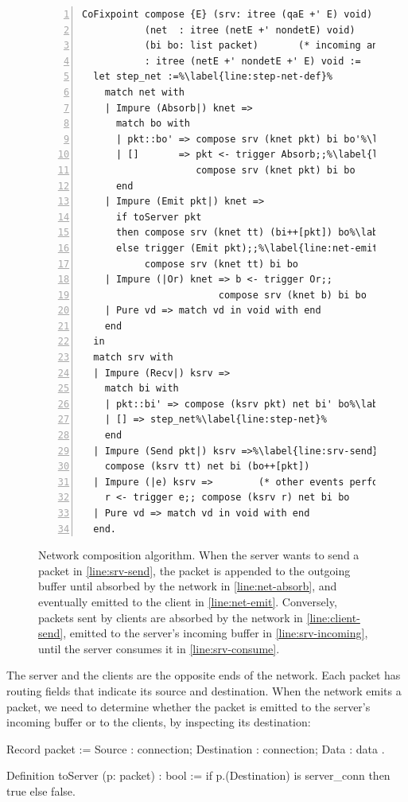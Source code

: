 \begin{figure}
\begin{lstlisting}[numbers=left]
CoFixpoint compose {E} (srv: itree (qaE +' E) void)   (* server  model *)
           (net  : itree (netE +' nondetE) void)      (* network model *)
           (bi bo: list packet)       (* incoming and outgoing buffers *)
           : itree (netE +' nondetE +' E) void :=
  let step_net :=%\label{line:step-net-def}%
    match net with
    | Impure (Absorb|) knet =>
      match bo with
      | pkt::bo' => compose srv (knet pkt) bi bo'%\label{line:net-absorb}%
      | []       => pkt <- trigger Absorb;;%\label{line:client-send}%
                    compose srv (knet pkt) bi bo
      end
    | Impure (Emit pkt|) knet =>
      if toServer pkt
      then compose srv (knet tt) (bi++[pkt]) bo%\label{line:srv-incoming}%
      else trigger (Emit pkt);;%\label{line:net-emit}%
           compose srv (knet tt) bi bo
    | Impure (|Or) knet => b <- trigger Or;;
                        compose srv (knet b) bi bo
    | Pure vd => match vd in void with end
    end
  in
  match srv with
  | Impure (Recv|) ksrv =>
    match bi with
    | pkt::bi' => compose (ksrv pkt) net bi' bo%\label{line:srv-consume}%
    | [] => step_net%\label{line:step-net}%
    end
  | Impure (Send pkt|) ksrv =>%\label{line:srv-send}%
    compose (ksrv tt) net bi (bo++[pkt])
  | Impure (|e) ksrv =>        (* other events performed by the server *)
    r <- trigger e;; compose (ksrv r) net bi bo
  | Pure vd => match vd in void with end
  end.
\end{lstlisting}
\caption[Network composition algorithm]{Network composition algorithm.  When the
  server wants to send a packet in \autoref{line:srv-send}, the packet is
  appended to the outgoing buffer until absorbed by the network in
  \autoref{line:net-absorb}, and eventually emitted to the client in
  \autoref{line:net-emit}.  Conversely, packets sent by clients are absorbed by
  the network in \autoref{line:client-send}, emitted to the server's incoming
  buffer in \autoref{line:srv-incoming}, until the server consumes it in
  \autoref{line:srv-consume}.}
\label{fig:net-compose-code}
\end{figure}

The server and the clients are the opposite ends of the network.  Each packet
has routing fields that indicate its source and destination.  When the network
emits a packet, we need to determine whether the packet is emitted to the
server's incoming buffer or to the clients, by inspecting its destination:
\begin{coq}
  Record packet := {
    Source      : connection;
    Destination : connection;
    Data        : data
  }.

  Definition toServer (p: packet) : bool :=
    if p.(Destination) is server_conn then true else false.
\end{coq}

